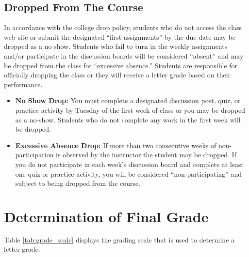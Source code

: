 \documentclass[11pt,]{article}
\begin{document}
\hypertarget{dropped-from-the-course}{%
\subsection{Dropped From The Course}\label{dropped-from-the-course}}

In accordance with the college drop policy, students who do not access
the class web site or submit the designated ``first assignments'' by the
due date may be dropped as a no show. Students who fail to turn in the
weekly assignments and/or participate in the discussion boards will be
considered ``absent'' and may be dropped from the class for ``excessive
absence.'' Students are responsible for officially dropping the class or
they will receive a letter grade based on their performance.

\begin{itemize}
\item
  \textbf{No Show Drop:} You must complete a designated discussion post,
  quiz, or practice activity by Tuesday of the first week of class or
  you may be dropped as a no-show. Students who do not complete any work
  in the first week will be dropped.
\item
  \textbf{Excessive Absence Drop:} If more than two consecutive weeks of
  non-participation is observed by the instructor the student may be
  dropped. If you do not participate in each week's discussion board and
  complete at least one quiz or practice activity, you will be
  considered ``non-participating'' and subject to being dropped from the
  course.
\end{itemize}

\hypertarget{determination-of-final-grade}{%
\section{Determination of Final
Grade}\label{determination-of-final-grade}}

Table \ref{tab:grade_scale} displays the grading scale that is used to
determine a letter grade.

\renewcommand{\arraystretch}{1.5}
\end{document}
